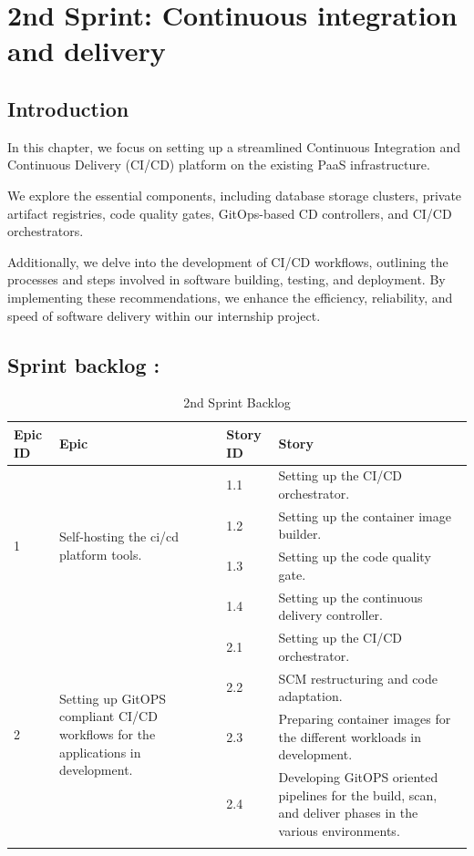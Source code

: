 \graphicspath{{./assets/}}
\setcounter{mtc}{3}
\chapter{2nd Sprint: Continuous integration and delivery }

\section*{Introduction}

\hspace{7mm}In this chapter, we focus on setting up a streamlined Continuous Integration and Continuous Delivery (CI/CD) platform on the existing PaaS infrastructure.

\hspace{7mm}We explore the essential components, including database storage clusters, private artifact registries, code quality gates, GitOps-based CD controllers, and CI/CD orchestrators.

\hspace{7mm}Additionally, we delve into the development of CI/CD workflows, outlining the processes and steps involved in software building, testing, and deployment. By implementing these recommendations, we enhance the efficiency, reliability, and speed of software delivery within our internship project.

\section{Sprint backlog :}

\begin{longtable}[H]{|m{1.5cm}|m{4cm}|m{1.5cm}|m{8cm}|}
\hline
{\textbf{Epic ID}} & {\textbf{Epic}} & {\textbf{Story ID}} & {\textbf{Story}}\\
\hline
\multirow{4}{1.5cm}{1} & \multirow{4}{4cm}{Self-hosting the ci/cd platform tools.}  &  1.1	 & Setting up the CI/CD orchestrator.\\
\cline{3-4}
& & 1.2 & Setting up the container image builder. \\
\cline{3-4}
& & 1.3	& Setting up the code quality gate. \\
\cline{3-4}
& & 1.4	& Setting up the continuous delivery controller. \\
\cline{3-4}
\hline
\multirow{4}{1.5cm}{2} & \multirow{4}{4cm}{Setting up GitOPS compliant CI/CD workflows for the applications in development.}  &  2.1	 & Setting up the CI/CD orchestrator.\\
\cline{3-4}
& & 2.2 & SCM restructuring and code adaptation. \\
\cline{3-4}
& & 2.3	& Preparing container images for the different workloads in development.  \\
\cline{3-4}
& & 2.4	& Developing GitOPS oriented pipelines for the build, scan, and deliver phases in the various environments.  \\
\cline{3-4}
\hline
\caption{2nd Sprint Backlog}
\end{longtable}

